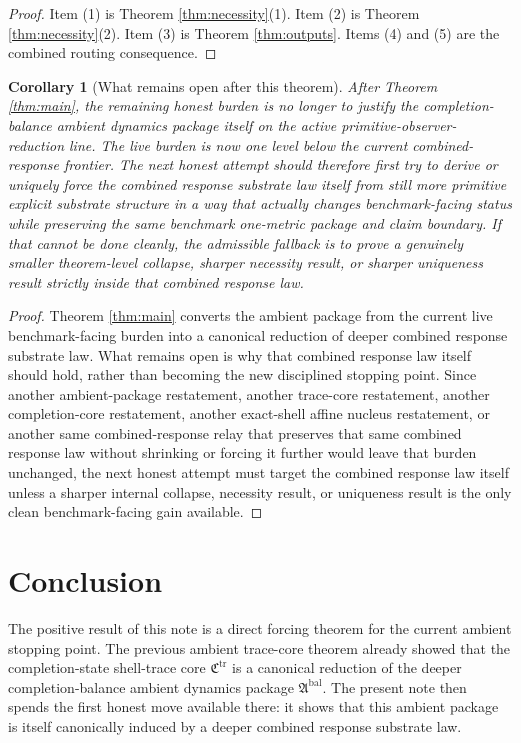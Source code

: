 \documentclass[11pt]{article}
\newcommand{\AmbientPackage}{\mathfrak A^{\mathrm{bal}}}
\newcommand{\TraceCore}{\mathfrak C^{\mathrm{tr}}}
\newtheorem{corollary}{Corollary}
\begin{document}
\begin{proof}
Item (1) is Theorem \ref{thm:necessity}(1). Item (2) is Theorem \ref{thm:necessity}(2). Item (3) is Theorem \ref{thm:outputs}. Items (4) and (5) are the combined routing consequence.
\end{proof}

\begin{corollary}[What remains open after this theorem]
\label{cor:next}
After Theorem \ref{thm:main}, the remaining honest burden is no longer to justify the completion-balance ambient dynamics package itself on the active primitive-observer-reduction line. The live burden is now one level below the current combined-response frontier. The next honest attempt should therefore first try to derive or uniquely force the combined response substrate law itself from still more primitive explicit substrate structure in a way that actually changes benchmark-facing status while preserving the same benchmark one-metric package and claim boundary. If that cannot be done cleanly, the admissible fallback is to prove a genuinely smaller theorem-level collapse, sharper necessity result, or sharper uniqueness result strictly inside that combined response law.
\end{corollary}

\begin{proof}
Theorem \ref{thm:main} converts the ambient package from the current live benchmark-facing burden into a canonical reduction of deeper combined response substrate law. What remains open is why that combined response law itself should hold, rather than becoming the new disciplined stopping point. Since another ambient-package restatement, another trace-core restatement, another completion-core restatement, another exact-shell affine nucleus restatement, or another same combined-response relay that preserves that same combined response law without shrinking or forcing it further would leave that burden unchanged, the next honest attempt must target the combined response law itself unless a sharper internal collapse, necessity result, or uniqueness result is the only clean benchmark-facing gain available.
\end{proof}

\section{Conclusion}

The positive result of this note is a direct forcing theorem for the current ambient stopping point. The previous ambient trace-core theorem already showed that the completion-state shell-trace core \(\TraceCore\) is a canonical reduction of the deeper completion-balance ambient dynamics package \(\AmbientPackage\). The present note then spends the first honest move available there: it shows that this ambient package is itself canonically induced by a deeper combined response substrate law.
\end{document}
